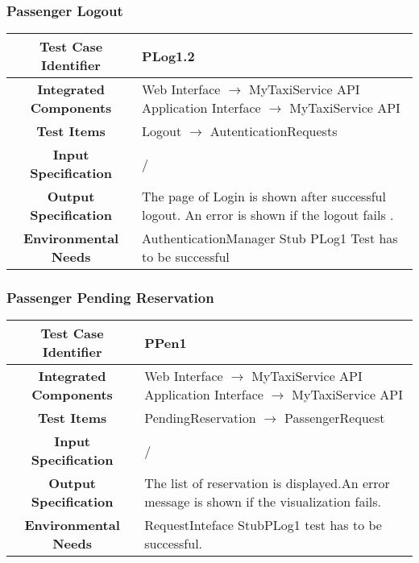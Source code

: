 \documentclass[11pt, a4paper,titlepage]{article}
\begin{document}
	\subsubsection{Passenger Logout}
	\begin{tabularx}{\textwidth}{| c|X|}
		\hline \textbf{Test Case Identifier} & \label{PLog1.2}PLog1.2 \\
		\hline \textbf{Integrated Components} & Web Interface $\rightarrow $ MyTaxiService API \newline 
		Application Interface $\rightarrow $ MyTaxiService API \\
		\hline \textbf{Test Items} & Logout $\rightarrow $ AutenticationRequests \\
		\hline \textbf{Input Specification} & / \\
		\hline \textbf{Output Specification} & 
		The page of Login is shown after successful logout.\newline
		An error is shown if the logout fails .\\
		\hline \textbf{Environmental Needs} & AuthenticationManager Stub \newline	PLog1 Test has to be successful \\
		\hline
	\end{tabularx}
	\newline
	\newline
	\subsubsection{Passenger Pending Reservation }
	\begin{tabularx}{\textwidth}{| c|X|}
		\hline \textbf{Test Case Identifier} & \label{PPen1}PPen1 \\
		\hline \textbf{Integrated Components} & Web Interface $\rightarrow $ MyTaxiService API \newline 
		Application Interface $\rightarrow $ MyTaxiService API \\ 
		\hline \textbf{Test Items} & PendingReservation $\rightarrow $ PassengerRequest \\
		\hline \textbf{Input Specification} & / \\
		\hline \textbf{Output Specification} & The list of reservation is displayed.\newline An error message is shown if the visualization fails. \\
		\hline \textbf{Environmental Needs} & RequestInteface Stub\newline PLog1 test has to be successful. \\
		\hline
	\end{tabularx}
	\newline
	\newline
\end{document}
